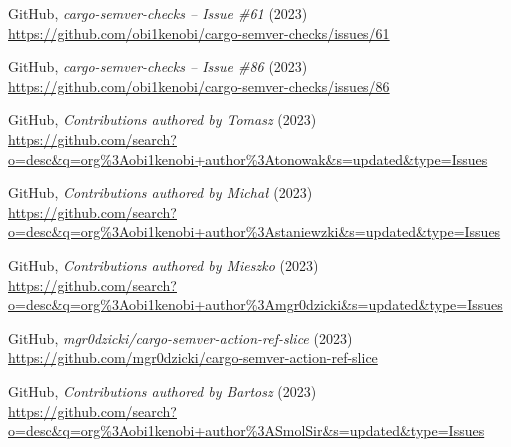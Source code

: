 \documentclass[licencjacka,en]{pracamgr}
\begin{document}
\begin{thebibliography}{99}

 GitHub,
	\textit{cargo-semver-checks -- Issue \#61} (2023) \\
	\url{https://github.com/obi1kenobi/cargo-semver-checks/issues/61}

 GitHub,
	\textit{cargo-semver-checks -- Issue \#86} (2023) \\
	\url{https://github.com/obi1kenobi/cargo-semver-checks/issues/86}










 GitHub,
	\textit{Contributions authored by Tomasz} (2023) \\
	\url{https://github.com/search?o=desc&q=org%3Aobi1kenobi+author%3Atonowak&s=updated&type=Issues}

 GitHub,
	\textit{Contributions authored by Michał} (2023) \\
	\url{https://github.com/search?o=desc&q=org%3Aobi1kenobi+author%3Astaniewzki&s=updated&type=Issues}

 GitHub,
	\textit{Contributions authored by Mieszko} (2023) \\
	\url{https://github.com/search?o=desc&q=org%3Aobi1kenobi+author%3Amgr0dzicki&s=updated&type=Issues}

 GitHub,
	\textit{mgr0dzicki/cargo-semver-action-ref-slice} (2023) \\
	\url{https://github.com/mgr0dzicki/cargo-semver-action-ref-slice}

 GitHub,
	\textit{Contributions authored by Bartosz} (2023) \\
	\url{https://github.com/search?o=desc&q=org%3Aobi1kenobi+author%3ASmolSir&s=updated&type=Issues}

\end{thebibliography}
\end{document}
